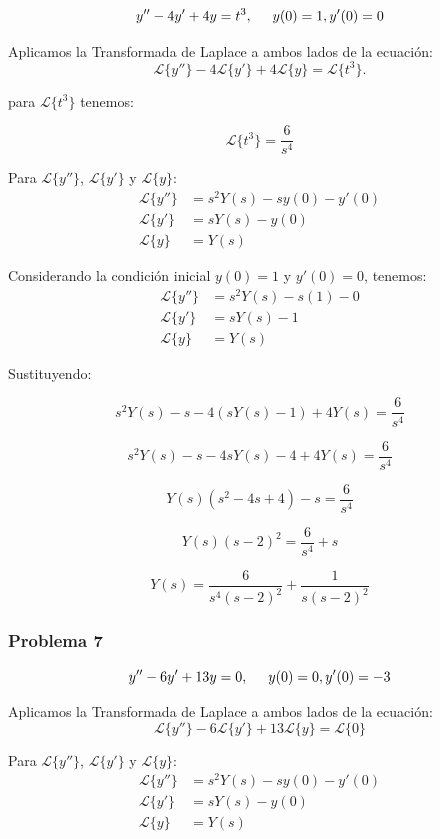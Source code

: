 \documentclass{article}
\begin{document}
\[y'' - 4y' + 4y = t^3, \hspace{.5cm} y(0) = 1, y'(0) = 0\]

Aplicamos la Transformada de Laplace a ambos lados de la ecuación:
\[
    \mathcal{L}\{y''\} - 4\mathcal{L}\{y'\} + 4\mathcal{L}\{y\} = \mathcal{L}\{t^3\}.
\]

para \(\mathcal{L}\{t^3\}\) tenemos:

\[\mathcal{L}\{t^3\} = \frac{6}{s^4}\]

Para \(\mathcal{L}\{y''\}\), \(\mathcal{L}\{y'\}\) y \(\mathcal{L}\{y\}\):
\begin{align*}
    \mathcal{L}\{y''\} & = s^2Y(s) - sy(0) - y'(0) \\
    \mathcal{L}\{y'\}  & = sY(s) - y(0)            \\
    \mathcal{L}\{y\}   & = Y(s)
\end{align*}

Considerando la condición inicial $y(0) = 1$ y $y'(0) = 0$, tenemos:
\begin{align*}
    \mathcal{L}\{y''\} & = s^2Y(s) - s(1) - 0 \\
    \mathcal{L}\{y'\}  & = sY(s) - 1          \\
    \mathcal{L}\{y\}   & = Y(s)
\end{align*}

Sustituyendo:

\[
    s^2Y(s) - s - 4(sY(s) - 1) + 4Y(s) = \frac{6}{s^4}
\]

\[
    s^2Y(s) - s - 4sY(s) - 4 + 4Y(s) = \frac{6}{s^4}
\]

\[
    Y(s)(s^2 - 4s + 4) - s = \frac{6}{s^4}
\]

\[
    Y(s)(s-2)^2 = \frac{6}{s^4} + s
\]

\[
    Y(s) = \frac{6}{s^4(s-2)^2} + \frac{1}{s(s-2)^2}
\]


\newpage


\subsubsection{Problema 7}

\[y'' - 6y' + 13y = 0, \hspace{.5cm} y(0) = 0, y'(0) = -3\]

Aplicamos la Transformada de Laplace a ambos lados de la ecuación:
\[
    \mathcal{L}\{y''\} - 6\mathcal{L}\{y'\} + 13\mathcal{L}\{y\} = \mathcal{L}\{0\}
\]

Para \(\mathcal{L}\{y''\}\), \(\mathcal{L}\{y'\}\) y \(\mathcal{L}\{y\}\):
\begin{align*}
    \mathcal{L}\{y''\} & = s^2Y(s) - sy(0) - y'(0) \\
    \mathcal{L}\{y'\}  & = sY(s) - y(0)            \\
    \mathcal{L}\{y\}   & = Y(s)
\end{align*}
\end{document}

